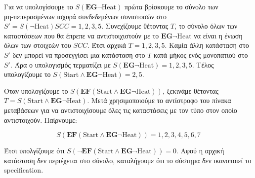\documentclass{article}
\newcommand{\english}[1]{\foreignlanguage{english}{{#1}}}
\begin{document}
Για να υπολογίσουμε το \english{$S(\mathbf{EG} \neg \text{Heat})$} πρώτα βρίσκουμε το σύνολο των \\
μη-πεπερασμένων ισχυρά συνδεδεμένων συνιστοσών στο \english{$S' = S(\neg \text{Heat}) SCC = {{1,2,3,5}}$}. 
Συνεχίζουμε θέτοντας $T$, το σύνολο όλων των καταστάσεων που θα έπρεπε να αντιστοιχιστούν με το \english{$\mathbf{EG} \neg \text{Heat}$} να είναι η ένωση όλων των στοιχεών του $SCC$. 
Έτσι αρχικά $T={1,2,3,5}$. Καμία άλλη κατάσταση στο $S'$ δεν μπορεί να προσεγγίσει μια κατάσταση στο $T$ κατά μήκος ενός μονοπατιού στο $S'$. 
Άρα ο υπολογισμός τερματίζει με \english{$S(\mathbf{EG} \neg \text{Heat}) = {1,2,3,5}$}. 
Τέλος υπολογίζουμε το \english{$S(\text{Start} \wedge \mathbf{EG} \neg \text{Heat}) = {2, 5}$}. 

Όταν υπολογίζουμε το \english{$S(\mathbf{EF} (\text{Start} \wedge \mathbf{EG} \neg \text{Heat}))$}, ξεκινάμε θέτοντας \english{$T = S(\text{Start} \wedge \mathbf{EG} \neg \text{Heat})$}. Μετά χρησιμοποιούμε το αντίστροφο του πίνακα μεταβάσεων για να αντιστοιχίσουμε όλες τις καταστάσεις με τον τύπο στον οποίο αντιστοιχούν. Παίρνουμε:
\begin{otherlanguage}{english}
    \begin{equation*}
    S(\mathbf{EF}(\text{Start} \wedge \mathbf{EG} \neg \text{Heat})) = {1,2,3,4,5,6,7}
    \end{equation*}
\end{otherlanguage}

Έτσι υπολγίζουμε ότι \english{$S(\neg \mathbf{EF}(\text{Start} \wedge \mathbf{EG} \neg \text{Heat})) = 0$}. Αφού η αρχική κατάσταση δεν περιέχεται στο σύνολο, καταλήγουμε ότι το σύστημα δεν ικανοποιεί το \english{specification}.


\begin{otherlanguage}{english}
\printbibliography    
\end{otherlanguage}
\end{document}
